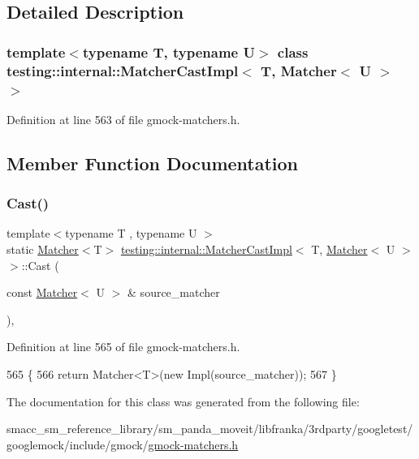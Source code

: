 \subsection{Detailed Description}
\subsubsection*{template$<$typename T, typename U$>$\newline
class testing\+::internal\+::\+Matcher\+Cast\+Impl$<$ T, Matcher$<$ U $>$ $>$}



Definition at line 563 of file gmock-\/matchers.\+h.



\subsection{Member Function Documentation}
\mbox{\label{classtesting_1_1internal_1_1MatcherCastImpl_3_01T_00_01Matcher_3_01U_01_4_01_4_a913a41264cc05c1fd261ee0cf1ede6fe}} 
\subsubsection{\texorpdfstring{Cast()}{Cast()}}
{\footnotesize\ttfamily template$<$typename T , typename U $>$ \\
static \hyperlink{classtesting_1_1Matcher}{Matcher}$<$T$>$ \hyperlink{classtesting_1_1internal_1_1MatcherCastImpl}{testing\+::internal\+::\+Matcher\+Cast\+Impl}$<$ T, \hyperlink{classtesting_1_1Matcher}{Matcher}$<$ U $>$ $>$\+::Cast (\begin{DoxyParamCaption}\item[{const \hyperlink{classtesting_1_1Matcher}{Matcher}$<$ U $>$ \&}]{source\+\_\+matcher }\end{DoxyParamCaption})\hspace{0.3cm}{\ttfamily [inline]}, {\ttfamily [static]}}



Definition at line 565 of file gmock-\/matchers.\+h.


\begin{DoxyCode}
565                                                            \{
566     \textcolor{keywordflow}{return} Matcher<T>(\textcolor{keyword}{new} Impl(source\_matcher));
567   \}
\end{DoxyCode}


The documentation for this class was generated from the following file\+:\begin{DoxyCompactItemize}
\item 
smacc\+\_\+sm\+\_\+reference\+\_\+library/sm\+\_\+panda\+\_\+moveit/libfranka/3rdparty/googletest/googlemock/include/gmock/\hyperlink{gmock-matchers_8h}{gmock-\/matchers.\+h}\end{DoxyCompactItemize}
